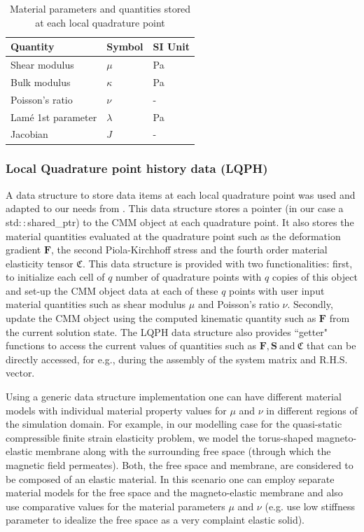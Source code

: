 \documentclass[11pt,a4paper,final]{article}
\begin{document}
\begin{table}[ht]
\centering
\begin{tabular}[c]{|C{4cm}|C{2cm}|C{2cm}|}
\hline
\textbf{Quantity} & \textbf{Symbol} & \textbf{SI Unit} \\
\hline
Shear modulus & $\mu$ & Pa \\
\hline
Bulk modulus & $\kappa$ & Pa \\
\hline
Poisson's ratio & $\nu$ & - \\
\hline
Lam\'e 1st parameter & $\lambda$ & Pa \\
\hline 
Jacobian & $J$ & - \\
\hline 
\end{tabular} 
\caption{Material parameters and quantities stored at each local quadrature point}
\label{tab:1}
\end{table}

\subsubsection{Local Quadrature point history data (LQPH)}
A data structure to store data items at each local quadrature point was used and adapted to our needs from \cite{Pelteret2012}. This data structure stores a pointer (in our case a std$::$shared\_ptr) to the CMM object at each quadrature point. It also stores the material quantities evaluated at the quadrature point such as the deformation gradient $\mathbf{F}$, the second Piola-Kirchhoff stress and the fourth order material elasticity tensor $\mathfrak{C}$. This data structure is provided with two functionalities: first, to initialize each cell of $q$ number of quadrature points with $q$ copies of this object and set-up the CMM object data at each of these $q$ points with user input material quantities such as shear modulus $\mu$ and Poisson's ratio $\nu$. Secondly, update the CMM object using the computed kinematic quantity such as $\mathbf{F}$ from the current solution state. The LQPH data structure also provides ``getter" functions to access the current values of quantities such as $\mathbf{F}, \mathbf{S} \ \text{and} \ \mathfrak{C}$ that can be directly accessed, for e.g., during the assembly of the system matrix and R.H.S. vector.\par 
Using a generic data structure implementation one can have different material models with individual material property values for $\mu$ and $\nu$ in different regions of the simulation domain. For example, in our modelling case for the quasi-static compressible finite strain elasticity problem, we model the torus-shaped magneto-elastic membrane along with the surrounding free space (through which the magnetic field permeates). Both, the free space and membrane, are considered to be composed of an elastic material. In this scenario one can employ separate material models for the free space and the magneto-elastic membrane and also use comparative values for the material parameters $\mu$ and $\nu$ (e.g. use low stiffness parameter to idealize the free space as a very complaint elastic solid). 
\end{document}
